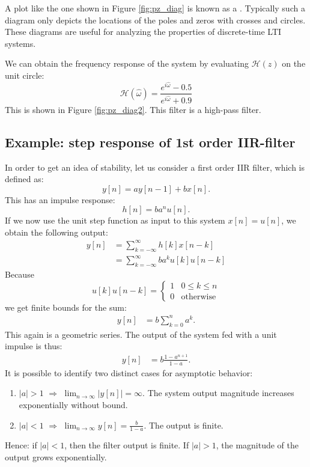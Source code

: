 A plot like the one shown in Figure \ref{fig:pz_diag} is known as a
\emph{}. Typically such a diagram only depicts the locations
of the poles and zeros with crosses and circles. These diagrams are
useful for analyzing the properties of discrete-time LTI systems.

We can obtain the frequency response of the system by evaluating
$\mathcal{H}(z)$ on the unit circle:
\begin{equation}
\mathcal{H}(\hat{\omega}) = \frac{e^{i\hat{\omega}}-0.5}{e^{i\hat{\omega}}+0.9}
\end{equation}
This is shown in Figure \ref{fig:pz_diag2}. This filter is a high-pass
filter.




\subsection{Example: step response of 1st order IIR-filter}

In order to get an idea of stability, let us consider a first order IIR filter, which is defined as:
\begin{equation}
y[n] = a y[n-1] + b x[n].
\end{equation}
This has an impulse response:
\begin{equation}
h[n] = b a^n u[n].
\end{equation}
If we now use the unit step function as input to this system $x[n]=u[n]$, we obtain the following output:
\begin{align}
y[n] &= \sum_{k=-\infty}^{\infty} h[k]x[n-k]  \\
     &= \sum_{k=-\infty}^{\infty} b a^k u[k]u[n-k]
\end{align}
Because 
\begin{equation}
u[k]u[n-k] = \left\{\begin{array}{cc}
1 & 0 \le k \le n\\
0 & \mathrm{otherwise}
\end{array}
\right.
\end{equation}
we get finite bounds for the sum:
\begin{align}
y[n] &= b \sum_{k=0}^{n} a^k.
\end{align}
This again is a geometric series. The output of the system fed with a unit impulse is thus:
\begin{align}
y[n] &= b\frac{1-a^{n+1}}{1-a}.
\end{align}
It is possible to identify two distinct cases for asymptotic behavior:
\begin{enumerate}
\item $|a|>1$ $\Rightarrow$ $\lim_{n\rightarrow \infty} |y[n]| = \infty$. The system output magnitude increases exponentially without bound.
\item $|a|<1$ $\Rightarrow$ $\lim_{n\rightarrow \infty}y[n]=\frac{b}{1-a}$. The output is finite. 
\end{enumerate}
Hence: if $|a|<1$, then the filter output is finite. If $|a|>1$, the magnitude of the output grows exponentially. 

